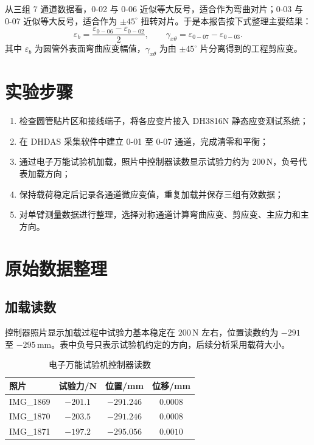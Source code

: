 \documentclass[UTF8,a4paper,10pt]{ctexart}
\begin{document}
从三组 7 通道数据看，0-02 与 0-06 近似等大反号，适合作为弯曲对片；0-03 与 0-07 近似等大反号，适合作为 $\pm45^\circ$ 扭转对片。于是本报告按下式整理主要结果：
\begin{equation}
    \varepsilon_b=\frac{\varepsilon_{0-06}-\varepsilon_{0-02}}{2},
    \qquad
    \gamma_{x\theta}=\varepsilon_{0-07}-\varepsilon_{0-03}.
\end{equation}
其中 $\varepsilon_b$ 为圆管外表面弯曲应变幅值，$\gamma_{x\theta}$ 为由 $\pm45^\circ$ 片分离得到的工程剪应变。

\section{实验步骤}

\begin{enumerate}
    \item 检查圆管贴片区和接线端子，将各应变片接入 DH3816N 静态应变测试系统；
    \item 在 DHDAS 采集软件中建立 0-01 至 0-07 通道，完成清零和平衡；
    \item 通过电子万能试验机加载，照片中控制器读数显示试验力约为 $200\,\mathrm{N}$，负号代表加载方向；
    \item 保持载荷稳定后记录各通道微应变值，重复加载并保存三组有效数据；
    \item 对单臂测量数据进行整理，选择对称通道计算弯曲应变、剪应变、主应力和主方向。
\end{enumerate}

\section{原始数据整理}

\subsection{加载读数}

控制器照片显示加载过程中试验力基本稳定在 $200\,\mathrm{N}$ 左右，位置读数约为 $-291$ 至 $-295\,\mathrm{mm}$。表中负号只表示试验机约定的方向，后续分析采用载荷大小。

\begin{table}[H]
    \centering
    \caption{电子万能试验机控制器读数}
    \begin{tabular}{lccc}
        \toprule
        照片 & 试验力/N & 位置/mm & 位移/mm \\
        \midrule
        IMG\_1869 & $-201.1$ & $-291.246$ & $0.0008$ \\
        IMG\_1870 & $-203.5$ & $-291.246$ & $0.0008$ \\
        IMG\_1871 & $-197.2$ & $-295.056$ & $0.0010$ \\
        \bottomrule
    \end{tabular}
\end{table}
\end{document}
